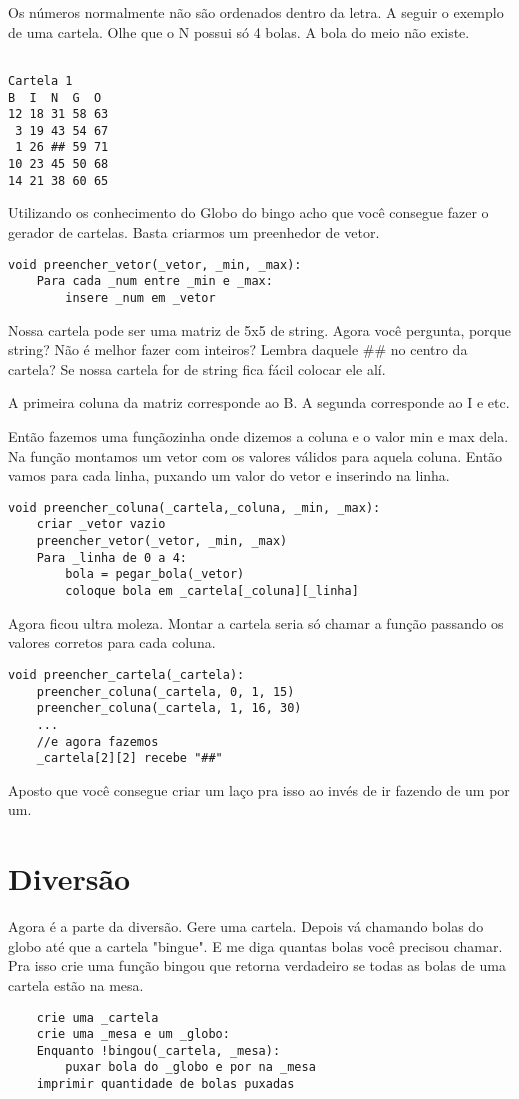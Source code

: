 \documentclass[12pt]{article}
\begin{document}
Os números normalmente não são ordenados dentro da letra. A seguir o exemplo de
uma cartela. Olhe que o N possui só 4 bolas. A bola do meio não existe.

\begin{verbatim}

Cartela 1
B  I  N  G  O
12 18 31 58 63 
 3 19 43 54 67 
 1 26 ## 59 71 
10 23 45 50 68 
14 21 38 60 65 

\end{verbatim}

Utilizando os conhecimento do Globo do bingo acho que você consegue fazer o
gerador de cartelas. Basta criarmos um preenhedor de vetor.

\begin{lstlisting}
void preencher_vetor(_vetor, _min, _max):
	Para cada _num entre _min e _max:
		insere _num em _vetor
\end{lstlisting}

Nossa cartela pode ser uma matriz de 5x5 de string. Agora você pergunta, porque
string? Não é melhor fazer com inteiros? Lembra daquele \#\# no centro da cartela? 
Se nossa cartela for de string fica fácil colocar ele alí. 

A primeira coluna da matriz corresponde ao B. A segunda corresponde ao I e etc.

Então fazemos uma funçãozinha onde dizemos a coluna e o valor min e max dela.
Na função montamos um vetor com os valores válidos para aquela coluna. 
Então vamos para cada linha, puxando um valor do vetor e inserindo na linha.

\begin{lstlisting}
void preencher_coluna(_cartela,_coluna, _min, _max):
	criar _vetor vazio
	preencher_vetor(_vetor, _min, _max)
	Para _linha de 0 a 4:
		bola = pegar_bola(_vetor)
		coloque bola em _cartela[_coluna][_linha]
\end{lstlisting}

Agora ficou ultra moleza. Montar a cartela seria só chamar a função passando 
os valores corretos para cada coluna.

\begin{lstlisting}
void preencher_cartela(_cartela):
	preencher_coluna(_cartela, 0, 1, 15)
	preencher_coluna(_cartela, 1, 16, 30)
	...
	//e agora fazemos
	_cartela[2][2] recebe "##"
\end{lstlisting}

Aposto que você consegue criar um laço pra isso ao invés de ir fazendo de um por
um.

\section{Diversão}

Agora é a parte da diversão. Gere uma cartela. Depois vá chamando bolas
do globo até que a cartela "bingue". E me diga quantas bolas você precisou 
chamar. Pra isso crie uma função bingou que retorna verdadeiro se todas as bolas 
de uma cartela estão na mesa.

\begin{lstlisting}
	crie uma _cartela 
	crie uma _mesa e um _globo:
	Enquanto !bingou(_cartela, _mesa):
		puxar bola do _globo e por na _mesa
	imprimir quantidade de bolas puxadas
\end{lstlisting}
\end{document}
